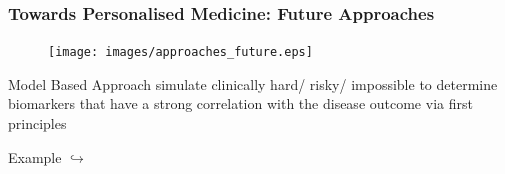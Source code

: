 \documentclass{beamer}
\begin{document}
\begin{frame}
	\frametitle{Towards Personalised Medicine: Future Approaches}
	\begin{minipage}{0.59\textwidth}
		\begin{figure}[H]
			\texttt{[image: images/approaches\_future.eps]}
		\end{figure}
	\end{minipage} \hfill
	\begin{minipage}{0.39\textwidth}
		\begin{block}{Model Based Approach}
			simulate clinically hard/ risky/ impossible to determine biomarkers that have a strong correlation with the disease outcome via first principles 
		\end{block}
		\begin{block}{Example}
			$\hookrightarrow$
		\end{block}
	\end{minipage}
\end{frame}
\end{document}

